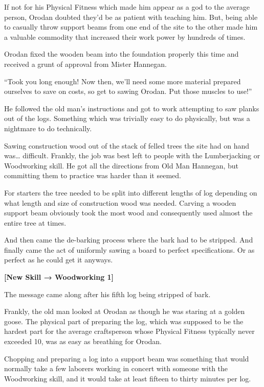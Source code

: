 \documentclass[a4paper,10pt]{book}
\begin{document}
If not for his Physical Fitness which made him appear as a god to the average person, Orodan doubted they’d be as patient with teaching him. But, being able to casually throw support beams from one end of the site to the other made him a valuable commodity that increased their work power by hundreds of times.\par
Orodan fixed the wooden beam into the foundation properly this time and received a grunt of approval from Mister Hannegan.\par
“Took you long enough! Now then, we’ll need some more material prepared ourselves to save on costs, so get to sawing Orodan. Put those muscles to use!”\par
He followed the old man’s instructions and got to work attempting to saw planks out of the logs. Something which was trivially easy to do physically, but was a nightmare to do technically.\par
Sawing construction wood out of the stack of felled trees the site had on hand was… difficult. Frankly, the job was best left to people with the Lumberjacking or Woodworking skill. He got all the directions from Old Man Hannegan, but committing them to practice was harder than it seemed.\par
For starters the tree needed to be split into different lengths of log depending on what length and size of construction wood was needed. Carving a wooden support beam obviously took the most wood and consequently used almost the entire tree at times.\par
And then came the de-barking process where the bark had to be stripped. And finally came the act of uniformly sawing a board to perfect specifications. Or as perfect as he could get it anyways.\par
\textbf{[New Skill → Woodworking 1]}\par
The message came along after his fifth log being stripped of bark.\par
Frankly, the old man looked at Orodan as though he was staring at a golden goose. The physical part of preparing the log, which was supposed to be the hardest part for the average craftsperson whose Physical Fitness typically never exceeded 10, was as easy as breathing for Orodan.\par
Chopping and preparing a log into a support beam was something that would normally take a few laborers working in concert with someone with the Woodworking skill, and it would take at least fifteen to thirty minutes per log.\par
\end{document}
